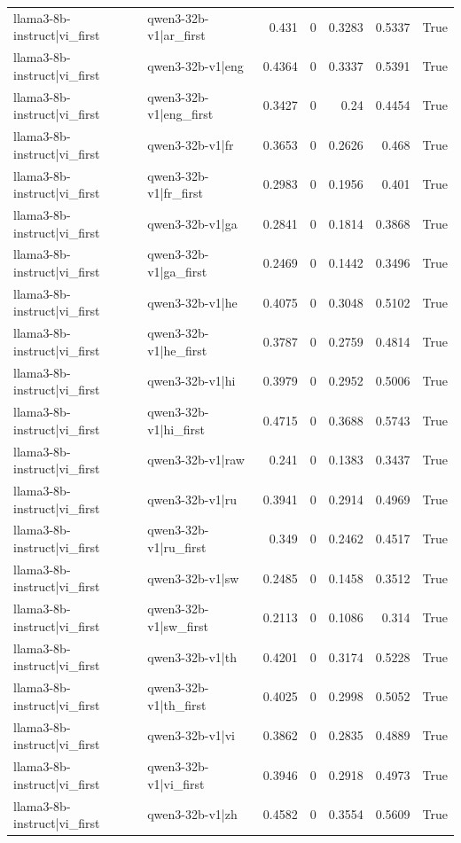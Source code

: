 \begin{table}
\begin{tabular}{l l r r r r l}
llama3-8b-instruct|vi_first & qwen3-32b-v1|ar_first & 0.431 & 0 & 0.3283 & 0.5337 & True \\
llama3-8b-instruct|vi_first & qwen3-32b-v1|eng & 0.4364 & 0 & 0.3337 & 0.5391 & True \\
llama3-8b-instruct|vi_first & qwen3-32b-v1|eng_first & 0.3427 & 0 & 0.24 & 0.4454 & True \\
llama3-8b-instruct|vi_first & qwen3-32b-v1|fr & 0.3653 & 0 & 0.2626 & 0.468 & True \\
llama3-8b-instruct|vi_first & qwen3-32b-v1|fr_first & 0.2983 & 0 & 0.1956 & 0.401 & True \\
llama3-8b-instruct|vi_first & qwen3-32b-v1|ga & 0.2841 & 0 & 0.1814 & 0.3868 & True \\
llama3-8b-instruct|vi_first & qwen3-32b-v1|ga_first & 0.2469 & 0 & 0.1442 & 0.3496 & True \\
llama3-8b-instruct|vi_first & qwen3-32b-v1|he & 0.4075 & 0 & 0.3048 & 0.5102 & True \\
llama3-8b-instruct|vi_first & qwen3-32b-v1|he_first & 0.3787 & 0 & 0.2759 & 0.4814 & True \\
llama3-8b-instruct|vi_first & qwen3-32b-v1|hi & 0.3979 & 0 & 0.2952 & 0.5006 & True \\
llama3-8b-instruct|vi_first & qwen3-32b-v1|hi_first & 0.4715 & 0 & 0.3688 & 0.5743 & True \\
llama3-8b-instruct|vi_first & qwen3-32b-v1|raw & 0.241 & 0 & 0.1383 & 0.3437 & True \\
llama3-8b-instruct|vi_first & qwen3-32b-v1|ru & 0.3941 & 0 & 0.2914 & 0.4969 & True \\
llama3-8b-instruct|vi_first & qwen3-32b-v1|ru_first & 0.349 & 0 & 0.2462 & 0.4517 & True \\
llama3-8b-instruct|vi_first & qwen3-32b-v1|sw & 0.2485 & 0 & 0.1458 & 0.3512 & True \\
llama3-8b-instruct|vi_first & qwen3-32b-v1|sw_first & 0.2113 & 0 & 0.1086 & 0.314 & True \\
llama3-8b-instruct|vi_first & qwen3-32b-v1|th & 0.4201 & 0 & 0.3174 & 0.5228 & True \\
llama3-8b-instruct|vi_first & qwen3-32b-v1|th_first & 0.4025 & 0 & 0.2998 & 0.5052 & True \\
llama3-8b-instruct|vi_first & qwen3-32b-v1|vi & 0.3862 & 0 & 0.2835 & 0.4889 & True \\
llama3-8b-instruct|vi_first & qwen3-32b-v1|vi_first & 0.3946 & 0 & 0.2918 & 0.4973 & True \\
llama3-8b-instruct|vi_first & qwen3-32b-v1|zh & 0.4582 & 0 & 0.3554 & 0.5609 & True \\

\end{tabular}
\end{table}
